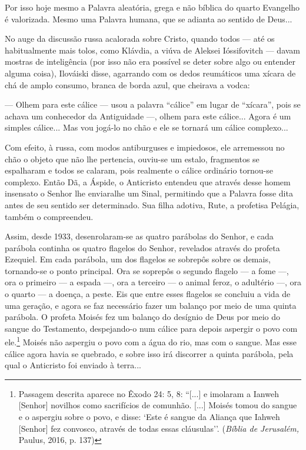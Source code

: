 Por isso hoje mesmo a Palavra aleatória, grega e não bíblica do quarto
Evangelho é valorizada. Mesmo uma Palavra humana, que se adianta ao
sentido de Deus...

No auge da discussão russa acalorada sobre Cristo, quando todos --- até
os habitualmente mais tolos, como Klávdia, a viúva de Aleksei
Ióssifovitch --- davam mostras de inteligência (por isso não era
possível se deter sobre algo ou entender alguma coisa), Ilováiski disse,
agarrando com os dedos reumáticos uma xícara de chá de amplo consumo,
branca de borda azul, que cheirava a vodca:

--- Olhem para este cálice --- usou a palavra ``cálice'' em lugar de
``xícara'', pois se achava um conhecedor da Antiguidade ---, olhem para
este cálice... Agora é um simples cálice... Mas vou jogá-lo no chão e
ele se tornará um cálice complexo...

Com efeito, à russa, com modos antiburguses e impiedosos, ele arremessou
no chão o objeto que não lhe pertencia, ouviu-se um estalo, fragmentos
se espalharam e todos se calaram, pois realmente o cálice ordinário
tornou-se complexo. Então Dã, a Áspide, o Anticristo entendeu que
através desse homem insensato o Senhor lhe enviaralhe um Sinal,
permitindo que a Palavra fosse dita antes de seu sentido ser
determinado. Sua filha adotiva, Rute, a profetisa Pelágia, também o
compreendeu.

Assim, desde 1933, desenrolaram-se as quatro parábolas do Senhor, e cada
parábola continha os quatro flagelos do Senhor, revelados através do
profeta Ezequiel. Em cada parábola, um dos flagelos se sobrepôs sobre os
demais, tornando-se o ponto principal. Ora se soprepôs o segundo flagelo
--- a fome ---, ora o primeiro --- a espada ---, ora a terceiro --- o
animal feroz, o adultério ---, ora o quarto --- a doença, a peste. Eis
que entre esses flagelos se concluiu a vida de uma geração, e agora se
faz necessário fazer um balanço por meio de uma quinta parábola. O
profeta Moisés fez um balanço do desígnio de Deus por meio do sangue do
Testamento, despejando-o num cálice para depois aspergir o povo com
ele.\footnote{Passagem descrita aparece no Êxodo 24: 5, 8: ``{[}...{]} e
  imolaram a Ianweh {[}Senhor{]} novilhos como sacrifícios de comunhão.
  {[}...{]} Moisés tomou do sangue e o aspergiu sobre o povo, e disse:
  `Este é sangue da Aliança que Iahweh {[}Senhor{]} fez convosco,
  através de todas essas cláusulas''. (\emph{Bíblia de Jerusalém,}
  Paulus, 2016, p. 137)} Moisés não aspergiu o povo com a água do rio,
mas com o sangue. Mas esse cálice agora havia se quebrado, e sobre isso
irá discorrer a quinta parábola, pela qual o Anticristo foi enviado à
terra...

